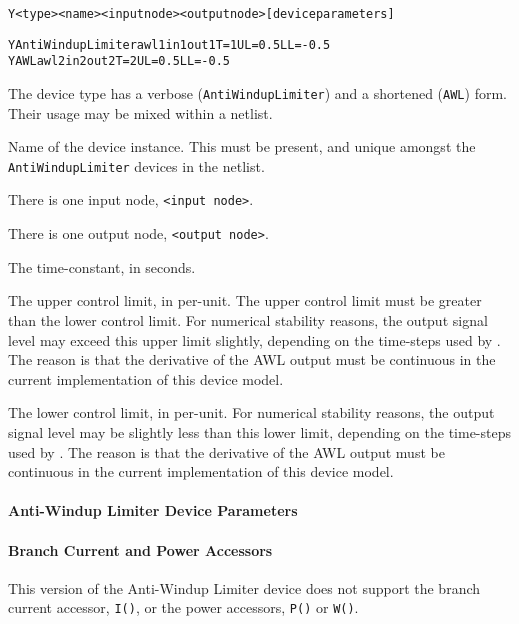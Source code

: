 \begin{Device}\label{AntiWindupLimiter}

\device
\begin{alltt}
Y<type> <name> <input node> <output node> [device parameters] 
\end{alltt}
  
\examples
\begin{alltt}
YAntiWindupLimiter awl1 in1 out1 T=1 UL=0.5 LL=-0.5
YAWL awl2 in2 out2 T=2 UL=0.5 LL=-0.5
\end{alltt}

\parameters 
\begin{Parameters}
The device type has a verbose (\texttt{AntiWindupLimiter}) and a shortened
(\texttt{AWL}) form.  Their usage may be mixed within a netlist.

Name of the device instance.  This must be present, and unique amongst the 
\texttt{AntiWindupLimiter} devices in the netlist.

There is one input node, \texttt{<input node>}. 

There is one output node, \texttt{<output node>}.

The time-constant, in seconds. 

The upper control limit, in per-unit. The upper control limit must be 
greater than the lower control limit.  For numerical stability reasons,
the output signal level may exceed this upper limit slightly, depending 
on the time-steps used by \Xyce{}. The reason is that the derivative of 
the AWL output must be continuous in the current implementation of this 
device model.

The lower control limit, in per-unit. For numerical stability reasons,
the output signal level may be slightly less than this lower limit, depending 
on the time-steps used by \Xyce{}. The reason is that the derivative of 
the AWL output must be continuous in the current implementation of this 
device model.
\end{Parameters}
\end{Device}

\paragraph{Anti-Windup Limiter Device Parameters}


\paragraph{Branch Current and Power Accessors}
This version of the Anti-Windup Limiter device does not 
support the branch current accessor, \texttt{I()}, 
or the power accessors, \texttt{P()} or \texttt{W()}.

